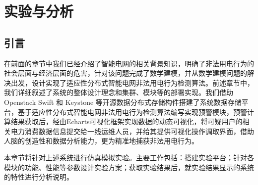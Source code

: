 
\raggedbottom
\chapter{实验与分析}
\label{chap:evaluation}







\section{引言}

在前面的章节中我们已经介绍了智能电网的相关背景知识，明确了非法用电行为的社会层面与经济层面的危害，针对该问题完成了数学建模，并从数学建模问题的解决出发，设计实现了适应性分布式智能电网非法用电行为检测算法。前述章节中，我们详细叙述了系统的整体设计理念和集群、模块等的部署实现。我们借助Openstack Swift 和 Keystone 等开源数据分布式存储构件搭建了系统数据存储平台，基于适应性分布式智能电网非法用电行为检测算法编写实现预警模块，预警计算结果获取后，经由Echarts可视化框架实现数据的动态可视化，将可疑用户的相关电力消费数据信息提交给一线运维人员，并给其提供可视化操作调取界面，借助人脑的创造性和数据分析能力，更为精准地捕获非法用电行为。

本章节将针对上述系统进行仿真模拟实验。主要工作包括：搭建实验平台；针对各模块的功能、性能等参数设计实验方案；获取实验结果后，就实验结果显示的系统的特性进行分析说明。

